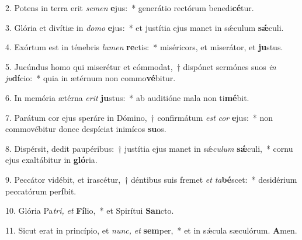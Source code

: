 \item 2. Potens in terra erit \textit{semen} \textbf{e}jus:~* generátio rectórum benedi\textbf{cé}tur.
\item 3. Glória et divítiæ in \textit{domo} \textbf{e}jus:~* et justítia ejus manet in sǽculum \textbf{sǽ}culi.
\item 4. Exórtum est in ténebris \textit{lumen} \textbf{re}ctis:~* miséricors, et miserátor, et \textbf{ju}stus.
\item 5. Jucúndus homo qui miserétur et cómmodat,~† dispónet sermónes suos \textit{in} \textit{ju}\textbf{dí}cio:~* quia in ætérnum non commo\textbf{vé}bitur.
\item 6. In memória ætérna \textit{erit} \textbf{ju}stus:~* ab auditióne mala non ti\textbf{mé}bit.
\item 7. Parátum cor ejus speráre in Dómino,~† confirmátum \textit{est} \textit{cor} \textbf{e}jus:~* non commovébitur donec despíciat inimícos \textbf{su}os.
\item 8. Dispérsit, dedit paupéribus:~† justítia ejus manet in sǽ\hspace{0.03em}\textit{culum} \textbf{sǽ}culi,~* cornu ejus exaltábitur in \textbf{gló}ria.
\item 9. Peccátor vidébit, et irascétur,~† déntibus suis fremet \textit{et} \textit{ta}\textbf{bé}scet:~* desidérium peccatórum per\textbf{í}bit.
\item 10. Glória Pa\hspace{0.03em}\textit{tri,} \textit{et} \textbf{Fí}lio,~* et Spirítui \textbf{San}cto.
\item 11. Sicut erat in princípio, et \textit{nunc,} \textit{et} \textbf{sem}per,~* et in sǽcula sæculórum. \textbf{A}men.
